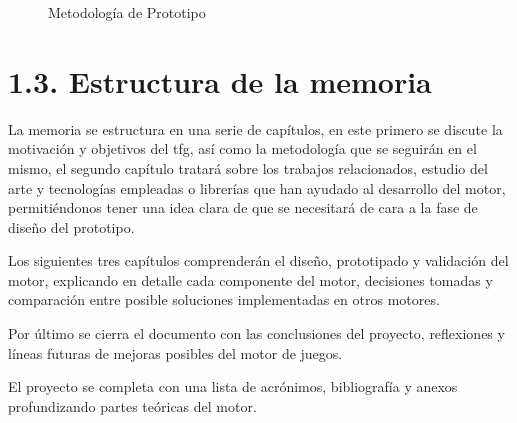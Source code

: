\begin{figure}[h!]
    \centering
    \caption{Metodología de Prototipo}
    \label{prototype_methodology}
\end{figure}

\newpage

\section*{1.3. Estructura de la memoria}\label{sec:structure}

La memoria se estructura en una serie de capítulos, en este primero se discute la motivación y objetivos del \gls{tfg},
así como la metodología que se seguirán en el mismo, el segundo capítulo tratará sobre los trabajos relacionados, estudio
del arte y tecnologías empleadas o librerías que han ayudado al desarrollo del motor, permitiéndonos tener una idea clara
de que se necesitará de cara a la fase de diseño del prototipo.

Los siguientes tres capítulos comprenderán el diseño, prototipado y validación del motor, explicando en detalle cada
componente del motor, decisiones tomadas y comparación entre posible soluciones implementadas en otros motores.

Por último se cierra el documento con las conclusiones del proyecto, reflexiones y líneas futuras de mejoras posibles
del motor de juegos.

El proyecto se completa con una lista de acrónimos, bibliografía y anexos profundizando partes teóricas del motor.